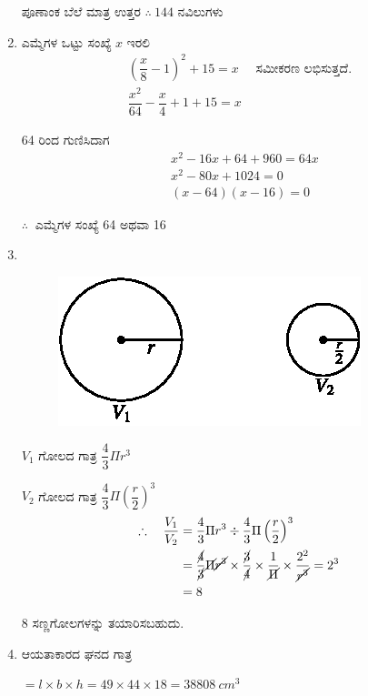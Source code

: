 \begin{enumerate}
ಪೂಣಾಂಕ ಬೆಲೆ ಮಾತ್ರ ಉತ್ತರ $\therefore~ 144$ ನವಿಲುಗಳು 

\item ಎಮ್ಮೆಗಳ ಒಟ್ಟು ಸಂಖ್ಯೆ $x$ ಇರಲಿ 
\begin{gather*}
\left(\dfrac{x}{8} - 1\right)^{2} + 15 = x \quad\text{ ಸಮೀಕರಣ ಲಭಿಸುತ್ತದೆ.}\\
\dfrac{x^{2}}{64} - \dfrac{x}{4} + 1 + 15 = x
\end{gather*}

64 ರಿಂದ ಗುಣಿಸಿದಾಗ 
\begin{align*}
& x^{2} - 16x + 64 + 960 = 64x\\
& x^{2} - 80x + 1024 = 0\\
& (x - 64) (x - 16) = 0
\end{align*}

$\therefore~$ ಎಮ್ಮೆಗಳ ಸಂಖ್ಯೆ 64 ಅಥವಾ  16

\item 
~

\begin{figure}[H]
\centering
\includegraphics[scale=1.1]{images/chap11/ans20.eps}
\end{figure}

$V_{1}$ ಗೋಲದ ಗಾತ್ರ $\dfrac{4}{3} \Pi r^{3}$

$V_{2}$ ಗೋಲದ ಗಾತ್ರ $\dfrac{4}{3} \Pi \left(\dfrac{r}{2}\right)^{3}$
\begin{align*}
\therefore\quad\dfrac{V_{1}}{V_{2}} & = \dfrac{4}{3}\Pi r^{3} \div {\dfrac{4}{3}\Pi \left(\dfrac{r}{2}\right)^{3}}\\
& = \dfrac{\cancel{4}}{\cancel{3}} \cancel{\Pi} \cancel{r^{3}} \times \dfrac{\cancel{3}}{\cancel{4}} \times \dfrac{1}{\cancel{\Pi}} \times \dfrac{2^{2}}{\cancel{r^{3}}} = 2^{3}\\
& = 8
\end{align*}

8 ಸಣ್ಣಗೋಲಗಳನ್ನು ತಯಾರಿಸಬಹುದು. 

\item ಆಯತಾಕಾರದ ಘನದ ಗಾತ್ರ 

$= l\times b\times h = 49\times 44\times 18 = 38808~cm^{3}$


\end{enumerate}
